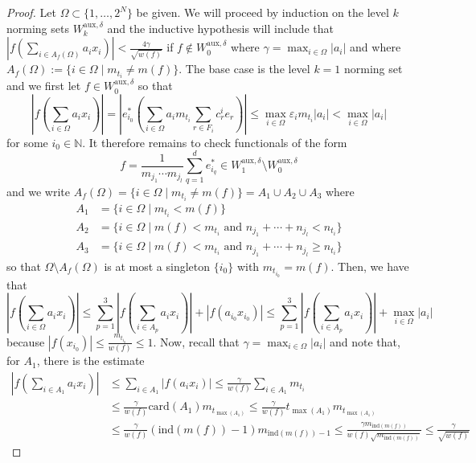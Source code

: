 \documentclass[12pt,a4paper]{amsart}
\newcommand{\N}{\mathbb{N}}
\newcommand{\bes}{\begin{equation*}}
\newcommand{\ees}{\end{equation*}}
\newcommand{\ep}{\varepsilon}
\theoremstyle{definition}
\theoremstyle{plain}
\begin{document}
\begin{proof}
Let $\Omega\subset\{1,\ldots,2^{N}\}$ be given. We will proceed by induction on the level $k$ norming sets $W^{\text{aux},\delta}_{k}$ and the inductive hypothesis will include that $\left\vert f\left(\sum_{i\in A_{f}(\Omega)}a_{i}x_{i}\right)\right\vert<\frac{4\gamma}{\sqrt{w(f)}}$ if $f\notin W_{0}^{\text{aux},\delta}$ where $\gamma=\max_{i\in\Omega}|a_{i}|$ and where $A_{f}(\Omega) :=\{i\in\Omega \mid m_{t_{i}}\neq m(f)\}$. The base case is the level $k=1$ norming set and we first let $f\in W^{\text{aux},\delta}_{0}$ so that   
\bes \left\vert f\left(\sum_{i\in\Omega}a_{i}x_{i}\right)\right\vert = \left\vert e^{*}_{i_{0}}\left(\sum_{i\in\Omega}a_{i}m_{t_{i}}\sum_{r\in F_{i}}c^{i}_{r}e_{r} \right)\right\vert \leq \max_{i\in\Omega}\ep_{i}m_{t_{i}}|a_{i}| < \max_{i\in\Omega}|a_{i}| \ees
for some $i_{0}\in\N$. It therefore remains to check functionals of the form
\bes f=\frac{1}{m_{j_{1}}\cdots m_{j_{l}}}\sum_{q=1}^{d}e^{*}_{i_{q}}\in W^{\text{aux},\delta}_{1}\setminus W^{\text{aux},\delta}_{0} \ees
and we write $A_{f}(\Omega)=\{ i\in\Omega \mid m_{t_{i}}\neq m(f)\}=A_{1}\cup A_{2}\cup A_{3}$ where
\begin{align*} A_{1}&=\{ i\in\Omega \mid m_{t_{i}}<m(f)\} \\ A_{2}&=\{ i\in\Omega \mid m(f)<m_{t_{i}}\text{ and } n_{j_{1}}+\cdots+n_{j_{l}}<n_{t_{i}}\} \\ A_{3}&=\{ i\in\Omega \mid m(f)<m_{t_{i}} \text{ and } n_{j_{1}}+\cdots+n_{j_{l}}\geq n_{t_{i}}\} \end{align*}
so that $\Omega\setminus A_{f}(\Omega)$ is at most a singleton $\{i_{0}\}$ with $m_{t_{i_{0}}}=m(f)$. Then, we have that
\bes \left\vert f\left(\sum_{i\in\Omega}a_{i}x_{i}\right)\right\vert\leq \sum_{p=1}^{3}\left\vert f\left(\sum_{i\in A_{p}}a_{i}x_{i}\right)\right\vert + |f(a_{i_{0}}x_{i_{0}})|\leq \sum_{p=1}^{3}\left\vert f\left(\sum_{i\in A_{p}}a_{i}x_{i}\right)\right\vert + \max_{i\in\Omega}|a_{i}| \ees
because $|f(x_{i_{0}})|\leq \frac{m_{t_{i_{0}}}}{w(f)}\leq 1$. Now, recall that $\gamma=\max_{i\in\Omega}|a_{i}|$ and note that, for $A_{1}$, there is the estimate
\begin{align*} \left\vert f\left(\sum_{i\in A_{1}}a_{i}x_{i}\right)\right\vert&\leq \sum_{i\in A_{1}}|f(a_{i}x_{i})|\leq \frac{\gamma}{w(f)}\sum_{i\in A_{1}}m_{t_{i}} \\ &\leq \frac{\gamma}{w(f)}\text{card}(A_{1})m_{t_{\max(A_{1})}} \leq \frac{\gamma}{w(f)}t_{\max(A_{1})}m_{t_{\max(A_{1})}} \\ &\leq \frac{\gamma}{w(f)}(\text{ind}(m(f))-1)m_{\text{ind}(m(f))-1} \leq \frac{\gamma m_{\text{ind}(m(f))}}{w(f)\sqrt{m_{\text{ind}(m(f))}}} \leq \frac{\gamma}{\sqrt{w(f)}}\end{align*}

\end{proof}
\end{document}
